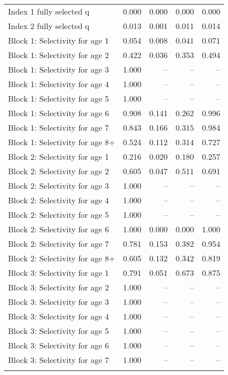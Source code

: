 \documentclass[
]{article}
\begin{document}
\begin{landscape}
\begin{longtable}[t]{lrrrr}
\endfoot
\bottomrule
\endlastfoot
Index 1 fully selected q & 0.000 & 0.000 & 0.000 & 0.000\\
Index 2 fully selected q & 0.013 & 0.001 & 0.011 & 0.014\\
Block 1: Selectivity for age 1 & 0.054 & 0.008 & 0.041 & 0.071\\
Block 1: Selectivity for age 2 & 0.422 & 0.036 & 0.353 & 0.494\\
Block 1: Selectivity for age 3 & 1.000 & -- & -- & --\\
\addlinespace
Block 1: Selectivity for age 4 & 1.000 & -- & -- & --\\
Block 1: Selectivity for age 5 & 1.000 & -- & -- & --\\
Block 1: Selectivity for age 6 & 0.908 & 0.141 & 0.262 & 0.996\\
Block 1: Selectivity for age 7 & 0.843 & 0.166 & 0.315 & 0.984\\
Block 1: Selectivity for age 8+ & 0.524 & 0.112 & 0.314 & 0.727\\
\addlinespace
Block 2: Selectivity for age 1 & 0.216 & 0.020 & 0.180 & 0.257\\
Block 2: Selectivity for age 2 & 0.605 & 0.047 & 0.511 & 0.691\\
Block 2: Selectivity for age 3 & 1.000 & -- & -- & --\\
Block 2: Selectivity for age 4 & 1.000 & -- & -- & --\\
Block 2: Selectivity for age 5 & 1.000 & -- & -- & --\\
\addlinespace
Block 2: Selectivity for age 6 & 1.000 & 0.000 & 0.000 & 1.000\\
Block 2: Selectivity for age 7 & 0.781 & 0.153 & 0.382 & 0.954\\
Block 2: Selectivity for age 8+ & 0.605 & 0.132 & 0.342 & 0.819\\
Block 3: Selectivity for age 1 & 0.791 & 0.051 & 0.673 & 0.875\\
Block 3: Selectivity for age 2 & 1.000 & -- & -- & --\\
\addlinespace
Block 3: Selectivity for age 3 & 1.000 & -- & -- & --\\
Block 3: Selectivity for age 4 & 1.000 & -- & -- & --\\
Block 3: Selectivity for age 5 & 1.000 & -- & -- & --\\
Block 3: Selectivity for age 6 & 1.000 & -- & -- & --\\
Block 3: Selectivity for age 7 & 1.000 & -- & -- & --\\
\addlinespace

\end{longtable}
\end{landscape}
\end{document}
